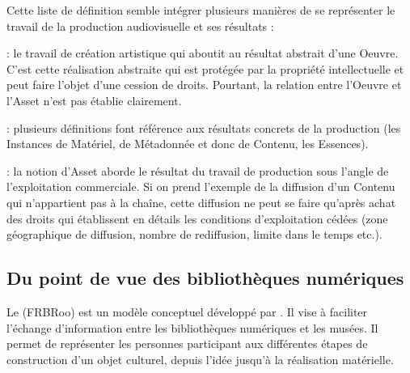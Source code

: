 Cette liste de définition semble intégrer plusieurs manières de se représenter le travail de la production audiovisuelle et ses résultats :
\begin{liste} 

	\item[\g{Artistique}] : le travail de création artistique qui aboutit au résultat abstrait d'une Oeuvre. 
	C'est cette réalisation abstraite qui est protégée par la propriété intellectuelle et peut faire l'objet d'une cession de droits.
	Pourtant, la relation entre l'Oeuvre et l'Asset n'est pas établie clairement.

	\item[\g{Concrète}] : plusieurs définitions font référence aux résultats concrets de la production (les Instances de Matériel, de Métadonnée et donc de Contenu, les Essences).

	\item[\g{Commerciale}] : la notion d'Asset aborde le résultat du travail de production sous l'angle de l'exploitation commerciale. 
	Si on prend l'exemple de la diffusion d'un Contenu qui n'appartient pas à la chaîne, cette diffusion ne peut se faire qu'après achat des droits qui établissent en détails les conditions d'exploitation cédées (zone géographique de diffusion, nombre de rediffusion, limite dans le temps etc.).
	
\end{liste}



\subsection{Du point de vue des bibliothèques numériques}\label{sec:pv-bn}
Le  (FRBRoo) est un modèle conceptuel développé par \cite{Aalberg2008}.
Il vise à faciliter l’échange d’information entre les bibliothèques numériques et les musées. 
Il permet de représenter les personnes participant aux différentes étapes de construction d’un objet culturel, depuis l’idée jusqu’à la réalisation matérielle.

